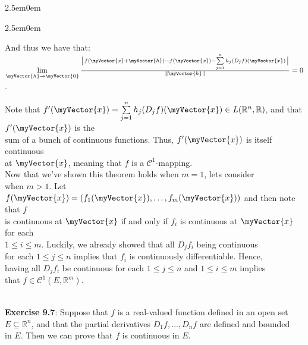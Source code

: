\documentclass{book}
\newcommand{\exOne}{%
   \color{Purple}%
   \fontsize{14}{16}\selectfont%
}
\newenvironment{myIndent}{%
   \begin{adjustwidth}{2.5em}{0em}%
}{%
   \end{adjustwidth}%
}
\newcommand{\mySepTwo}[1][.]{%
   {\noindent\color{#1}{\rule{6.5in}{0.5mm}}}\\%
}
\newcommand{\retTwo}{\hfill\bigbreak}
\newcommand{\myVS}{\vphantom{\ensuremath{\int_a^b}}}
\newcommand{\mVec}[1]{\myVector{#1}}
\begin{document}
{\begin{myIndent}
{\begin{myIndent}
      And thus we have that: $\lim\limits_{\mVec{h} \rightarrow \mVec{0}}\frac{\left|\myVS\right.f(\mVec{x} + \mVec{h}) - f(\mVec{x}) - \sum\limits_{j=1}^nh_j(D_jf)(\mVec{x})\left.\myVS\right|}{\|\mVec{h}\|} = 0$.\retTwo

      Note that $f^\prime(\mVec{x}) = \sum\limits_{j=1}^nh_j(D_jf)(\mVec{x}) \in L(\mathbb{R}^n, \mathbb{R})$, and that $f^\prime(\mVec{x})$ is the\\ [-2pt] sum of a bunch of continuous functions. Thus, $f^\prime(\mVec{x})$ is itself continuous\\ [5pt] at $\mVec{x}$, meaning that $f$ is a $\mathscr{C}^1$-mapping.\\ [8pt]

      Now that we've shown this theorem holds when $m = 1$, lets consider\\ when $m > 1$. Let $f(\mVec{x}) = (f_1(\mVec{x}), \ldots, f_m(\mVec{x}))$ and then note that $f$\\ is continuous at $\mVec{x}$ if and only if $f_i$ is continuous at $\mVec{x}$ for each\\ $1 \leq i \leq m$. Luckily, we already showed that all $D_jf_i$ being continuous\\ for each $1 \leq j \leq n$ implies that $f_i$ is continuously differentiable. Hence,\\ having all $D_jf_i$ be continuous for each $1 \leq j \leq n$ and $1 \leq i \leq m$ implies\\ that $f \in \mathscr{C}^{1}(E, \mathbb{R}^m)$.\retTwo
   \end{myIndent}}
\end{myIndent}}

\exOne
\mySepTwo

\textbf{Exercise 9.7}: Suppose that $f$ is a real-valued function defined in an open set\\ $E \subseteq \mathbb{R}^n$, and that the partial derivatives $D_1f, \ldots, D_nf$ are defined and bounded\\ in $E$. Then we can prove that $f$ is continuous in $E$.\\ [-6pt]
\end{document}

